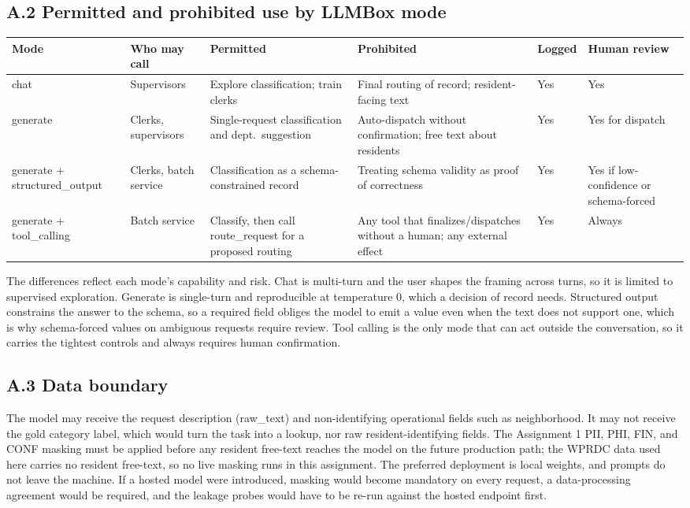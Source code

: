\documentclass[11pt]{article}
\begin{document}
\subsection*{A.2 Permitted and prohibited use by LLMBox mode}
\begin{center}
\footnotesize
\begin{tabularx}{\textwidth}{L{2.2cm} L{2.1cm} X X L{0.9cm} L{1.6cm}}
\toprule
\textbf{Mode} & \textbf{Who may call} & \textbf{Permitted} & \textbf{Prohibited} & \textbf{Logged} & \textbf{Human review} \\
\midrule
chat & Supervisors & Explore classification; train clerks & Final routing of record; resident-facing text & Yes & Yes \\
generate & Clerks, supervisors & Single-request classification and dept.\ suggestion & Auto-dispatch without confirmation; free text about residents & Yes & Yes for dispatch \\
generate + structured\_output & Clerks, batch service & Classification as a schema-constrained record & Treating schema validity as proof of correctness & Yes & Yes if low-confidence or schema-forced \\
generate + tool\_calling & Batch service & Classify, then call route\_request for a proposed routing & Any tool that finalizes/dispatches without a human; any external effect & Yes & Always \\
\bottomrule
\end{tabularx}
\end{center}

The differences reflect each mode's capability and risk. Chat is multi-turn and the user shapes the framing across turns, so it is limited to supervised exploration. Generate is single-turn and reproducible at temperature 0, which a decision of record needs. Structured output constrains the answer to the schema, so a required field obliges the model to emit a value even when the text does not support one, which is why schema-forced values on ambiguous requests require review. Tool calling is the only mode that can act outside the conversation, so it carries the tightest controls and always requires human confirmation.

\subsection*{A.3 Data boundary}
The model may receive the request description (raw\_text) and non-identifying operational fields such as neighborhood. It may not receive the gold category label, which would turn the task into a lookup, nor raw resident-identifying fields. The Assignment 1 PII, PHI, FIN, and CONF masking must be applied before any resident free-text reaches the model on the future production path; the WPRDC data used here carries no resident free-text, so no live masking runs in this assignment. The preferred deployment is local weights, and prompts do not leave the machine. If a hosted model were introduced, masking would become mandatory on every request, a data-processing agreement would be required, and the leakage probes would have to be re-run against the hosted endpoint first.
\end{document}
